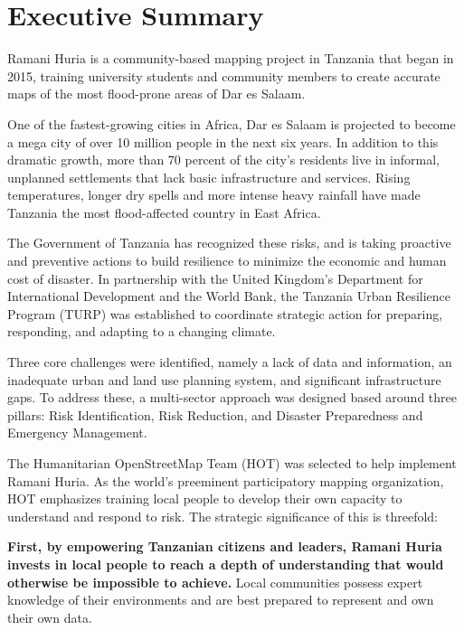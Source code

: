\documentclass[a4paper,12pt,twoside]{article}
\begin{document}
\section{Executive Summary}
\label{executivesummary}
\begin{multicols}{2}

Ramani Huria is a community-based mapping project in Tanzania that began in 2015, training university students and community members to create accurate maps of the most flood-prone areas of Dar es Salaam. 

One of the fastest-growing cities in Africa, Dar es Salaam is projected to become a mega city of over 10 million people in the next six years. In addition to this dramatic growth, more than 70 percent of the city's residents live in informal, unplanned settlements that lack basic infrastructure and services. Rising temperatures, longer dry spells and more intense heavy rainfall have made Tanzania the most flood-affected country in East Africa.

The Government of Tanzania has recognized these risks, and is taking proactive and preventive actions to build resilience to minimize the economic and human cost of disaster. In partnership with the United Kingdom's Department for International Development and the World Bank, the Tanzania Urban Resilience Program (TURP) was established to coordinate strategic action for preparing, responding, and adapting to a changing climate.

Three core challenges were identified, namely a lack of data and information, an inadequate urban and land use planning system, and significant infrastructure gaps. To address these, a multi-sector approach was designed based around three pillars: Risk Identification, Risk Reduction, and Disaster Preparedness and Emergency Management. 

The Humanitarian OpenStreetMap Team (HOT) was selected  to help implement  Ramani Huria. As the world's preeminent participatory mapping organization, HOT emphasizes training local people  to develop their own capacity to understand and respond to risk. The strategic significance of this is threefold: 



\textbf{First, by empowering Tanzanian citizens and leaders, Ramani Huria invests in local people to reach a depth of understanding that would otherwise be impossible to achieve.} Local communities possess expert knowledge of their environments and are best prepared to represent and own their own data. 


\end{multicols}
\end{document}

